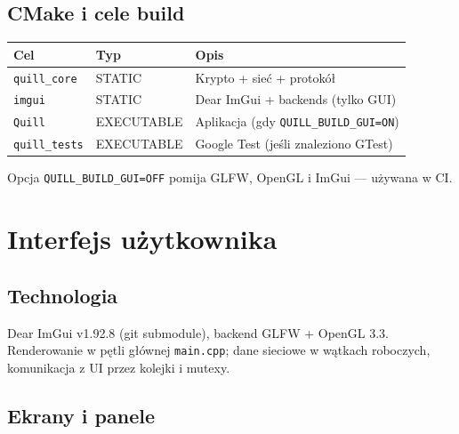 \documentclass[12pt,a4paper]{article}
\begin{document}
\subsection{CMake i cele build}

\begin{table}[H]
\centering
\begin{tabular}{@{}llp{7cm}@{}}
\toprule
\textbf{Cel} & \textbf{Typ} & \textbf{Opis} \\
\midrule
\texttt{quill\_core} & STATIC & Krypto + sieć + protokół \\
\texttt{imgui} & STATIC & Dear ImGui + backends (tylko GUI) \\
\texttt{Quill} & EXECUTABLE & Aplikacja (gdy \texttt{QUILL\_BUILD\_GUI=ON}) \\
\texttt{quill\_tests} & EXECUTABLE & Google Test (jeśli znaleziono GTest) \\
\bottomrule
\end{tabular}
\end{table}

Opcja \texttt{QUILL\_BUILD\_GUI=OFF} pomija GLFW, OpenGL i ImGui --- używana w CI.

\section{Interfejs użytkownika}

\subsection{Technologia}

Dear ImGui v1.92.8 (git submodule), backend GLFW + OpenGL 3.3. Renderowanie w pętli głównej \texttt{main.cpp}; dane sieciowe w wątkach roboczych, komunikacja z UI przez kolejki i mutexy.

\subsection{Ekrany i panele}
\end{document}
